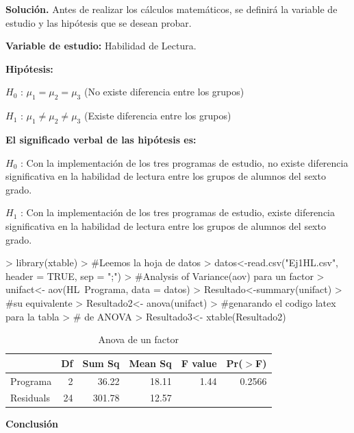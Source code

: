\documentclass[12pt,letterpaper]{report}
\begin{document}
\textbf{Solución.}
Antes de realizar los cálculos matemáticos, se definirá la variable de estudio y las hipótesis
que se desean probar.

\textbf{Variable de estudio:} Habilidad de Lectura.

\textbf{Hipótesis:}

$H_{0}$ : $\mu_1 = \mu_2 = \mu_3$ (No existe diferencia entre los grupos)

$H_{1}$ : $\mu_1 \not= \mu_2 \not= \mu_3$ (Existe diferencia entre los grupos)

\textbf{El significado verbal de las hipótesis es:}

\textbf{$H_{0}$} : Con la implementación de los tres programas de estudio, no existe diferencia
significativa en la habilidad de lectura entre los grupos de alumnos del sexto grado.

\textbf{$H_{1}$} : Con la implementación de los tres programas de estudio, existe diferencia significativa en la habilidad de lectura entre los grupos de alumnos del sexto grado.

\begin{Schunk}
\begin{Sinput}
> library(xtable)
> #Leemos la hoja de datos
> datos<-read.csv("Ej1HL.csv", header = TRUE, sep = ";")
> #Analysis of Variance(aov) para un factor
> unifact<- aov(HL~Programa, data = datos)
> Resultado<-summary(unifact)
> #su equivalente
> Resultado2<- anova(unifact)
> #genarando el codigo latex para la tabla
> # de ANOVA
> Resultado3<- xtable(Resultado2) 
\end{Sinput}
\end{Schunk}

\begin{table}[ht]
\centering
\begin{tabular}{lrrrrr}
  \hline
 & Df & Sum Sq & Mean Sq & F value & Pr($>$F) \\ 
  \hline
Programa    & 2 & 36.22 & 18.11 & 1.44 & 0.2566 \\ 
  Residuals   & 24 & 301.78 & 12.57 &  &  \\ 
   \hline
\end{tabular}
\caption{Anova de un factor}
\end{table}

\textbf{Conclusión}
\end{document}
